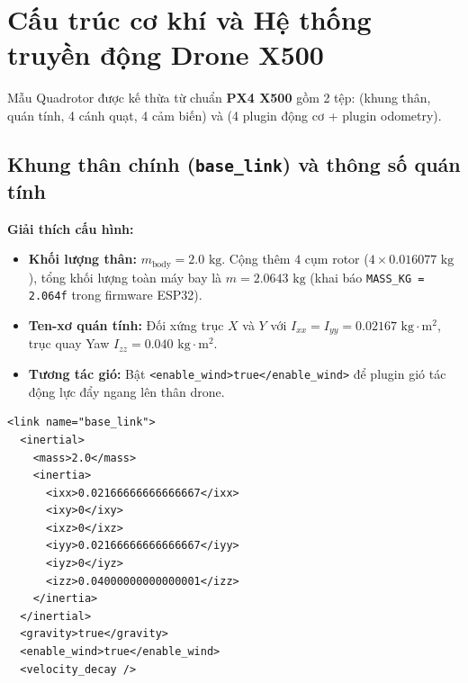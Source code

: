 \documentclass[11pt,a4paper]{article}
\begin{document}
\section{Cấu trúc cơ khí và Hệ thống truyền động Drone X500}

Mẫu Quadrotor được kế thừa từ chuẩn \textbf{PX4 X500} gồm 2 tệp:  (khung thân, quán tính, 4 cánh quạt, 4 cảm biến) và  (4 plugin động cơ + plugin odometry).

\subsection{Khung thân chính (\texttt{base\_link}) và thông số quán tính}
\noindent
\begin{minipage}[t]{0.45\textwidth}
\vspace{0pt}
\textbf{Giải thích cấu hình:}
\begin{itemize}
    \item \textbf{Khối lượng thân:} $m_{\text{body}} = 2.0\text{ kg}$. Cộng thêm $4$ cụm rotor ($4 \times 0.016077\text{ kg}$), tổng khối lượng toàn máy bay là $m = 2.0643\text{ kg}$ (khai báo \texttt{MASS\_KG = 2.064f} trong firmware ESP32).
    \item \textbf{Ten-xơ quán tính:} Đối xứng trục $X$ và $Y$ với $I_{xx} = I_{yy} = 0.02167\text{ kg}\cdot\text{m}^2$, trục quay Yaw $I_{zz} = 0.040\text{ kg}\cdot\text{m}^2$.
    \item \textbf{Tương tác gió:} Bật \texttt{<enable\_wind>true</enable\_wind>} để plugin gió tác động lực đẩy ngang lên thân drone.
\end{itemize}
\end{minipage}
\hfill
\begin{minipage}[t]{0.52\textwidth}
\vspace{0pt}
\begin{lstlisting}[language=SDF, firstnumber=7]
<link name="base_link">
  <inertial>
    <mass>2.0</mass>
    <inertia>
      <ixx>0.02166666666666667</ixx>
      <ixy>0</ixy>
      <ixz>0</ixz>
      <iyy>0.02166666666666667</iyy>
      <iyz>0</iyz>
      <izz>0.04000000000000001</izz>
    </inertia>
  </inertial>
  <gravity>true</gravity>
  <enable_wind>true</enable_wind>
  <velocity_decay />
\end{lstlisting}
\end{minipage}

\vspace{1em}
\end{document}
